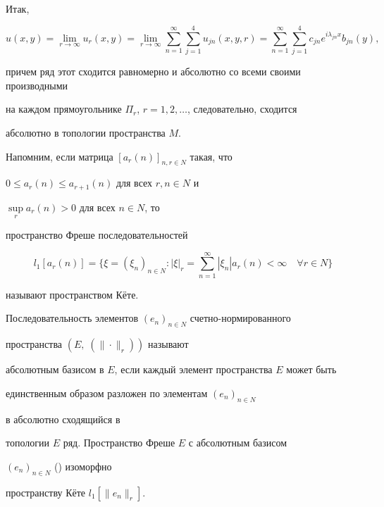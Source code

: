 \begin{pf}
\begin{align*}
\end{align*} 


Итак, 


$$ 


u(x,y)=\lim_{r\to\infty}u_r(x,y)=\lim_{r\to\infty}\sum^\infty_{n=1} 


\sum^4_{j=1}u_{jn}(x,y,r)= 


\sum^\infty_{n=1}\sum^4_{j=1}c_{jn}e^{i\lambda_{jn}x}b_{jn}(y), 


$$ 


причем ряд этот сходится равномерно и абсолютно со всеми своими производными 


на каждом прямоугольнике $\Pi_r$, $r=1,2,\dotsc$, следовательно, сходится 


абсолютно в топологии пространства $M$. \end{pf} 


 


Напомним, если матрица $[a_r(n)]_{n,r\in N}$ такая, что 


$0\le a_r(n)\le a_{r+1}(n)$ для всех $r,n\in N$ и 


$\sup\limits_r a_r(n)>0$ для всех $n\in N$, то 


пространство Фреше последовательностей 


$$ 


l_1[a_r(n)]=\biggl\{\xi=(\xi_n)_{n\in N}: |\xi|_r 


=\sum^\infty_{n=1}|\xi_n|a_r(n)<\infty\quad \forall r\in N\biggr\} 


$$ 


называют пространством К\"ете. 


 


Последовательность элементов $(e_n)_{n\in N}$ счетно-нормированного 


пространства $(E,\;(\|\cdot\|_r))$ называют 


абсолютным базисом в $E$, если каждый элемент пространства $E$ может быть 


единственным образом разложен по элементам $(e_n)_{n\in N}$ 


в абсолютно сходящийся в 


топологии $E$ ряд. Пространство Фреше $E$ с абсолютным базисом 


$(e_n)_{n\in N}$ (\cite{Dra}) изоморфно 


пространству К\"ете $l_1[\|e_n\|_r]$. 


 


